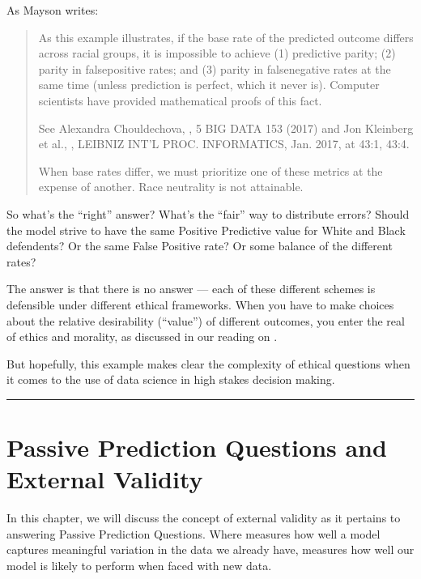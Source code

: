 \documentclass[letterpaper,10pt,english]{jupyterBook}
\begin{document}
\sphinxAtStartPar
{}

\sphinxAtStartPar
As Mayson writes:
\begin{quote}

\sphinxAtStartPar
As this example illustrates, if the base rate of the predicted outcome differs across racial groups, it is impossible to achieve (1) predictive parity; (2) parity in false\sphinxhyphen{}positive rates; and (3) parity in false\sphinxhyphen{}negative rates at the same time (unless prediction is perfect, which it never is). Computer scientists have provided mathematical proofs of this fact.%
\begin{footnote}[2]\sphinxAtStartFootnote
See Alexandra Chouldechova, , 5 BIG DATA 153 (2017) and Jon Kleinberg et al., , LEIBNIZ INT’L PROC. INFORMATICS, Jan. 2017, at 43:1, 43:4.
%
\end{footnote} When base rates differ, we must prioritize one of these metrics at the expense of another. Race neutrality is not attainable.
\end{quote}

\sphinxAtStartPar
So what’s the “right” answer? What’s the “fair” way to distribute errors? Should the model strive to have the same Positive Predictive value for White and Black defendents? Or the same False Positive rate? Or some balance of the different rates?

\sphinxAtStartPar
The answer is that there is no  answer — each of these different schemes is defensible under different ethical frameworks. When you have to make choices about the relative desirability (“value”) of different outcomes, you enter the real of ethics and morality, as discussed in our reading on {\hyperref[\detokenize{30_questions/05_descriptive_v_prescriptive::doc}]{}}.

\sphinxAtStartPar
But hopefully, this example makes clear the complexity  of ethical questions when it comes to the use of data science in high stakes decision making.


\bigskip\hrule\bigskip


\sphinxstepscope


\chapter{Passive Prediction Questions and External Validity}
\label{\detokenize{30_questions/27_passive_external_general:passive-prediction-questions-and-external-validity}}\label{\detokenize{30_questions/27_passive_external_general::doc}}
\sphinxAtStartPar
In this chapter, we will discuss the concept of external validity as it pertains to answering Passive Prediction Questions. Where  measures how well a model captures meaningful variation in the data we already have,  measures how well our model is likely to perform when faced with new data.
\end{document}
